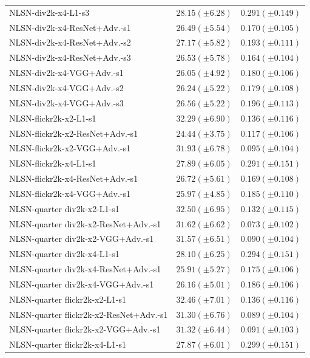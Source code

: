 \documentclass[10pt]{article} %
\begin{document}
\begin{longtable}{| p{} | p{} | p{} |}
NLSN-div2k-x4-L1-s3 & $28.15 (\pm 6.28)$ & $0.291 (\pm 0.149)$ \\
NLSN-div2k-x4-ResNet+Adv.-s1 & $26.49 (\pm 5.54)$ & $0.170 (\pm 0.105)$ \\
NLSN-div2k-x4-ResNet+Adv.-s2 & $27.17 (\pm 5.82)$ & $0.193 (\pm 0.111)$ \\
NLSN-div2k-x4-ResNet+Adv.-s3 & $26.53 (\pm 5.78)$ & $0.164 (\pm 0.104)$ \\
NLSN-div2k-x4-VGG+Adv.-s1 & $26.05 (\pm 4.92)$ & $0.180 (\pm 0.106)$ \\
NLSN-div2k-x4-VGG+Adv.-s2 & $26.24 (\pm 5.22)$ & $0.179 (\pm 0.108)$ \\
NLSN-div2k-x4-VGG+Adv.-s3 & $26.56 (\pm 5.22)$ & $0.196 (\pm 0.113)$ \\
NLSN-flickr2k-x2-L1-s1 & $32.29 (\pm 6.90)$ & $0.136 (\pm 0.116)$ \\
NLSN-flickr2k-x2-ResNet+Adv.-s1 & $24.44 (\pm 3.75)$ & $0.117 (\pm 0.106)$ \\
NLSN-flickr2k-x2-VGG+Adv.-s1 & $31.93 (\pm 6.78)$ & $0.095 (\pm 0.104)$ \\
NLSN-flickr2k-x4-L1-s1 & $27.89 (\pm 6.05)$ & $0.291 (\pm 0.151)$ \\
NLSN-flickr2k-x4-ResNet+Adv.-s1 & $26.72 (\pm 5.61)$ & $0.169 (\pm 0.108)$ \\
NLSN-flickr2k-x4-VGG+Adv.-s1 & $25.97 (\pm 4.85)$ & $0.185 (\pm 0.110)$ \\
NLSN-quarter div2k-x2-L1-s1 & $32.50 (\pm 6.95)$ & $0.132 (\pm 0.115)$ \\
NLSN-quarter div2k-x2-ResNet+Adv.-s1 & $31.62 (\pm 6.62)$ & $0.073 (\pm 0.102)$ \\
NLSN-quarter div2k-x2-VGG+Adv.-s1 & $31.57 (\pm 6.51)$ & $0.090 (\pm 0.104)$ \\
NLSN-quarter div2k-x4-L1-s1 & $28.10 (\pm 6.25)$ & $0.294 (\pm 0.151)$ \\
NLSN-quarter div2k-x4-ResNet+Adv.-s1 & $25.91 (\pm 5.27)$ & $0.175 (\pm 0.106)$ \\
NLSN-quarter div2k-x4-VGG+Adv.-s1 & $26.16 (\pm 5.01)$ & $0.186 (\pm 0.106)$ \\
NLSN-quarter flickr2k-x2-L1-s1 & $32.46 (\pm 7.01)$ & $0.136 (\pm 0.116)$ \\
NLSN-quarter flickr2k-x2-ResNet+Adv.-s1 & $31.30 (\pm 6.76)$ & $0.089 (\pm 0.104)$ \\
NLSN-quarter flickr2k-x2-VGG+Adv.-s1 & $31.32 (\pm 6.44)$ & $0.091 (\pm 0.103)$ \\
NLSN-quarter flickr2k-x4-L1-s1 & $27.87 (\pm 6.01)$ & $0.299 (\pm 0.151)$ \\

\end{longtable}
\end{document}

